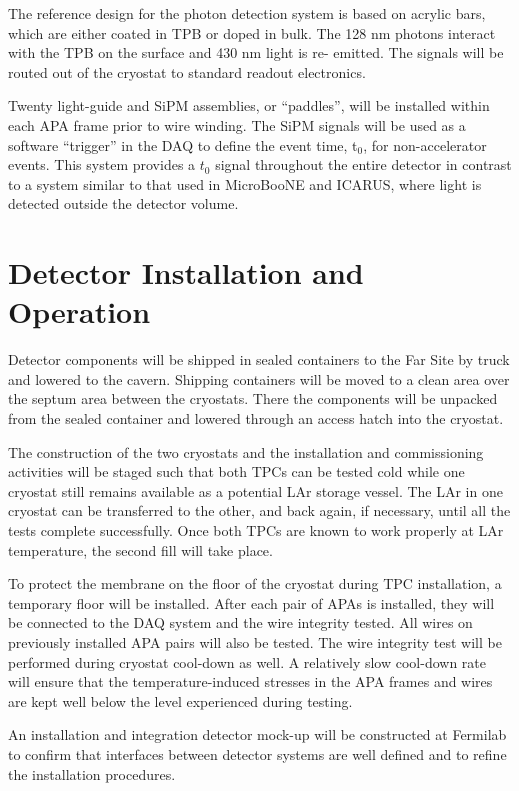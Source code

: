 The reference design for the photon detection system is based on acrylic bars, which are either coated in 
TPB or doped in bulk. The 128 nm photons interact with the TPB on the surface and 430 nm light is re-
emitted. The signals will be routed out of the cryostat to standard readout electronics.

Twenty light-guide and SiPM assemblies, or ``paddles'', will be installed within each APA frame prior to wire winding. The SiPM signals will be used as a software ``trigger'' in the DAQ to define the event time, t$_0$, for non-accelerator events. This system provides a $t_0$ signal throughout the entire detector in contrast to a system similar to that used in MicroBooNE and ICARUS, where light is detected outside the detector volume. 

\section{Detector Installation and Operation}
\label{sec:det-install}

Detector components will be shipped in sealed containers to the Far Site by truck and lowered to the cavern. Shipping containers will be moved to a clean area over the septum area between the cryostats. There the components will be unpacked from the sealed container and lowered  through an access hatch into the cryostat. 

The construction of the two cryostats and the installation and commissioning activities will
be staged such that both TPCs can be tested cold while one cryostat still remains available
as a potential LAr storage vessel. The LAr in one cryostat can be transferred to the other, and
back again, if necessary, until all the tests complete successfully. Once both TPCs are known to work properly at LAr temperature, the second fill will take place.

To protect the membrane on the floor of the cryostat during TPC installation, a temporary floor will be installed. 
After each pair of APAs is installed, they will be connected to the DAQ system and the wire integrity tested. All wires on previously installed APA pairs will also be tested. The wire integrity test will be performed during cryostat cool-down as well. A relatively slow cool-down rate will ensure that the temperature-induced stresses in the APA frames and wires are kept well below the level experienced during testing. 

An installation and integration detector mock-up will be constructed at Fermilab to confirm that interfaces between detector systems are well defined and to refine the installation procedures. 

